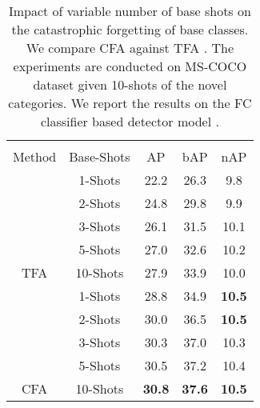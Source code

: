 \documentclass[10pt,twocolumn,letterpaper]{article}
\begin{document}
\begin{table}[t!] \centering
	\setlength{\tabcolsep}{4.0mm}
	\scalebox{0.8}
	{\begin{tabular}{c|c|ccc}
\toprule[1.1pt]
			\multicolumn{1}{c|}{}            & \multicolumn{1}{c|}{}                  &\multicolumn{3}{c}{} \\
			\multicolumn{1}{c|}{\multirow{-2}{*}{Method}}      &\multicolumn{1}{c|}{\multirow{-2}{*}{Base-Shots}}                        & \multicolumn{1}{c}{\multirow{-2}{*}{AP}}            & \multicolumn{1}{c}{\multirow{-2}{*}{bAP}}  &  \multicolumn{1}{c}{\multirow{-2}{*}{nAP}}                 \\
			\midrule[0.9pt]
			  & 1-Shots &22.2&26.3&9.8\\
			  & 2-Shots &24.8&29.8&9.9 \\
			  & 3-Shots &26.1&31.5&10.1 \\
			  & 5-Shots &27.0&32.6&10.2 \\
			  \multirow{-5}{*}{TFA} & 10-Shots &27.9&33.9&10.0 \\
			\midrule[1pt]
			  & 1-Shots &28.8&34.9&\textbf{10.5}\\
			  & 2-Shots &30.0&36.5&\textbf{10.5} \\
			  & 3-Shots &30.3&37.0&10.3 \\
			  & 5-Shots &30.5&37.2&10.4 \\
			  \multirow{-5}{*}{CFA} & 10-Shots &\textbf{30.8}&\textbf{37.6}&\textbf{10.5} \\ 
			\bottomrule[1.1pt]
	\end{tabular}}
	\vspace{-0.18cm}
	\caption{Impact of variable number of base shots on the catastrophic forgetting of base classes. We compare CFA against TFA \cite{TFA}. The experiments are conducted on MS-COCO dataset given 10-shots of the novel categories. We report the results on the FC classifier based detector model \cite{FasterR-CNN}.}
 	\vspace{-1em}
	\label{tab:base-shots-ablation-study}
\end{table}
 
\end{document}
